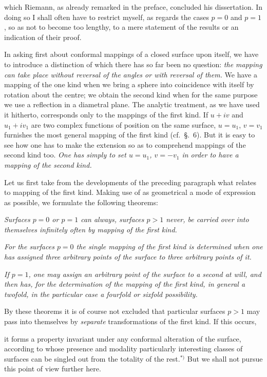 \documentclass{article}
\begin{document}
which Riemann, as already remarked in the preface, concluded his dissertation. In doing so I shall often have to restrict myself, as regards the cases $p = 0$ and $p = 1$, so as not to become too lengthy, to a mere statement of the results or an indication of their proof.

In asking first about conformal mappings of a closed surface upon itself, we have to introduce a distinction of which there has so far been no question: \emph{the mapping can take place without reversal of the angles or with reversal of them.} We have a mapping of the one kind when we bring a sphere into coincidence with itself by rotation about the centre; we obtain the second kind when for the same purpose we use a reflection in a diametral plane. The analytic treatment, as we have used it hitherto, corresponds only to the mappings of the first kind. If $u + iv$ and $u_{1} + iv_{1}$ are two complex functions of position on the same surface, $u = u_{1}$, $v = v_{1}$ furnishes the most general mapping of the first kind (cf.\ §.~6). But it is easy to see how one has to make the extension so as to comprehend mappings of the second kind too. \emph{One has simply to set $u = u_{1}$, $v = - v_{1}$ in order to have a mapping of the second kind.}

Let us first take from the developments of the preceding paragraph what relates to mapping of the first kind. Making use of as geometrical a mode of expression as possible, we formulate the following theorems:

\emph{Surfaces $p = 0$ or $p = 1$ can always, surfaces $p > 1$ never, be carried over into themselves infinitely often by mapping of the first kind.}

\emph{For the surfaces $p = 0$ the single mapping of the first kind is determined when one has assigned three arbitrary points of the surface to three arbitrary points of it.}

\emph{If $p = 1$, one may assign an arbitrary point of the surface to a second at will, and then has, for the determination of the mapping of the first kind, in general a twofold, in the particular case a fourfold or sixfold possibility.}

By these theorems it is of course not excluded that particular surfaces $p > 1$ may pass into themselves by \emph{separate} transformations of the first kind. If this occurs,

it forms a property invariant under any conformal alteration of the surface, according to whose presence and modality particularly interesting classes of surfaces can be singled out from the totality of the rest.${}^{*)}$ But we shall not pursue this point of view further here.
\end{document}

